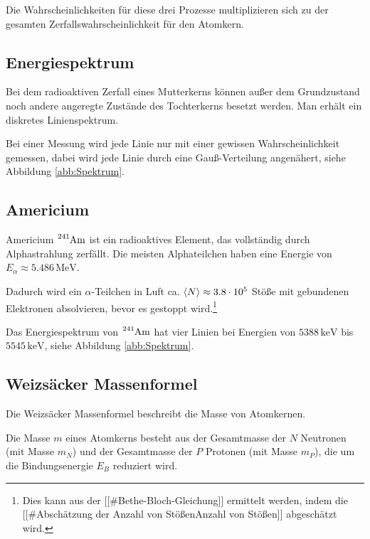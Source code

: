 \documentclass[12pt,a4paper]{scrartcl}
\numberwithin{equation}{section} %
\renewcommand{\[}{} %
\renewcommand{\]}{\noindent} %
\begin{document}
Die Wahrscheinlichkeiten für diese drei Prozesse multiplizieren sich zu
der gesamten Zerfallswahrscheinlichkeit für den Atomkern.

\hypertarget{energiespektrum}{%
\subsection{Energiespektrum}\label{energiespektrum}}

Bei dem radioaktiven Zerfall eines Mutterkerns können außer dem
Grundzustand noch andere angeregte Zustände des Tochterkerns besetzt
werden. Man erhält ein diskretes Linienspektrum.

Bei einer Messung wird jede Linie nur mit einer gewissen
Wahrscheinlichkeit gemessen, dabei wird jede Linie durch eine
Gauß-Verteilung angenähert, siehe Abbildung \ref{abb:Spektrum}.

\hypertarget{americium}{%
\subsection{Americium}\label{americium}}

Americium $\ce{^{241}Am}$ ist ein radioaktives Element, das
vollständig durch Alphastrahlung zerfällt. Die meisten Alphateilchen
haben eine Energie von $E_\alpha\approx 5.486 \mathrm{\,MeV}$.

Dadurch wird ein $\alpha$-Teilchen in Luft ca.
$\expval{N} \approx 3.8 \cdot 10^5$ Stöße mit gebundenen Elektronen
absolvieren, bevor es gestoppt wird.\footnote{Dies kann aus der
  {[}{[}\#Bethe-Bloch-Gleichung{]}{]} ermittelt werden, indem die
  {[}{[}\#Abschätzung der Anzahl von Stößen\textbar Anzahl von
  Stößen{]}{]} abgeschätzt wird.}

Das Energiespektrum von $\ce{^{241}Am}$ hat vier Linien bei Energien
von $5388\mathrm{\,keV}$ bis $5545\mathrm{\,keV}$, siehe Abbildung \ref{abb:Spektrum}.

\hypertarget{weizsuxe4cker-massenformel}{%
\subsection{Weizsäcker Massenformel}\label{weizsuxe4cker-massenformel}}

Die Weizsäcker Massenformel beschreibt die Masse von Atomkernen.

Die Masse $m$ eines Atomkerns besteht aus der Gesamtmasse der $N$
Neutronen (mit Masse $m_N$) und der Gesamtmasse der $P$ Protonen
(mit Masse $m_P$), die um die Bindungsenergie $E_B$ reduziert wird.
\end{document}
